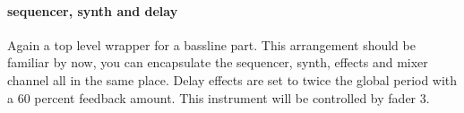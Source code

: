 \paragraph{sequencer, synth and delay}
Again a top level wrapper for a bassline part. This arrangement
should be familiar by now, you can encapsulate the sequencer, synth,
effects and mixer channel all in the same place. Delay effects
are set to twice the global period with a 60 percent feedback amount.
This instrument will be controlled by fader 3.
